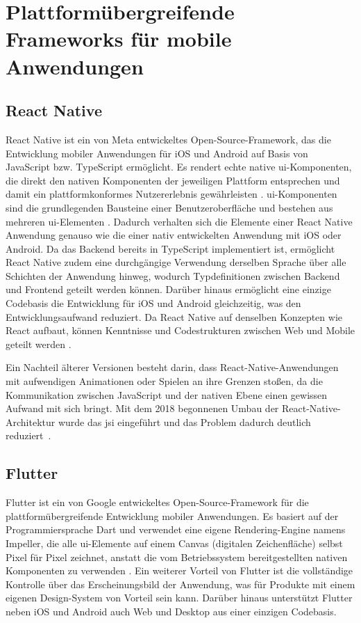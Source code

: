 \section{Plattformübergreifende Frameworks für mobile Anwendungen}

\subsection{React Native}

React Native ist ein von Meta entwickeltes Open-Source-Framework, das die Entwicklung mobiler Anwendungen für iOS und Android auf Basis von JavaScript bzw. TypeScript ermöglicht. Es rendert echte native \gls{ui}-Komponenten, die direkt den nativen Komponenten der jeweiligen Plattform entsprechen und damit ein plattformkonformes Nutzererlebnis gewährleisten \cite{react-native-docs}. \gls{ui}-Komponenten sind die grundlegenden Bausteine einer Benutzeroberfläche und bestehen aus mehreren \gls{ui}-Elementen \cite[S.~4]{galitz2002}. Dadurch verhalten sich die Elemente einer React Native Anwendung genauso wie die einer nativ entwickelten Anwendung mit iOS oder Android. Da das Backend bereits in TypeScript implementiert ist, ermöglicht React Native zudem eine durchgängige Verwendung derselben Sprache über alle Schichten der Anwendung hinweg, wodurch Typdefinitionen zwischen Backend und Frontend geteilt werden können. Darüber hinaus ermöglicht eine einzige Codebasis die Entwicklung für iOS und Android gleichzeitig, was den Entwicklungsaufwand reduziert. Da React Native auf denselben Konzepten wie React aufbaut, können Kenntnisse und Codestrukturen zwischen Web und Mobile geteilt werden \cite{react-native-docs}.

Ein Nachteil älterer Versionen besteht darin, dass React-Native-Anwendungen mit aufwendigen Animationen oder Spielen an ihre Grenzen stoßen, da die Kommunikation zwischen JavaScript und der nativen Ebene einen gewissen Aufwand mit sich bringt. Mit dem 2018 begonnenen Umbau der React-Native-Architektur wurde das \gls{jsi} eingeführt und das Problem dadurch deutlich reduziert~\cite{react-native-new-arch}.

\subsection{Flutter}

Flutter ist ein von Google entwickeltes Open-Source-Framework für die plattformübergreifende Entwicklung mobiler Anwendungen. Es basiert auf der Programmiersprache Dart und verwendet eine eigene Rendering-Engine namens Impeller, die alle \gls{ui}-Elemente auf einem Canvas (digitalen Zeichenfläche) selbst Pixel für Pixel zeichnet, anstatt die vom Betriebssystem bereitgestellten nativen Komponenten zu verwenden \cite{flutter-docs}. Ein weiterer Vorteil von Flutter ist die vollständige Kontrolle über das Erscheinungsbild der Anwendung, was für Produkte mit einem eigenen Design-System von Vorteil sein kann. Darüber hinaus unterstützt Flutter neben iOS und Android auch Web und Desktop aus einer einzigen Codebasis. 

